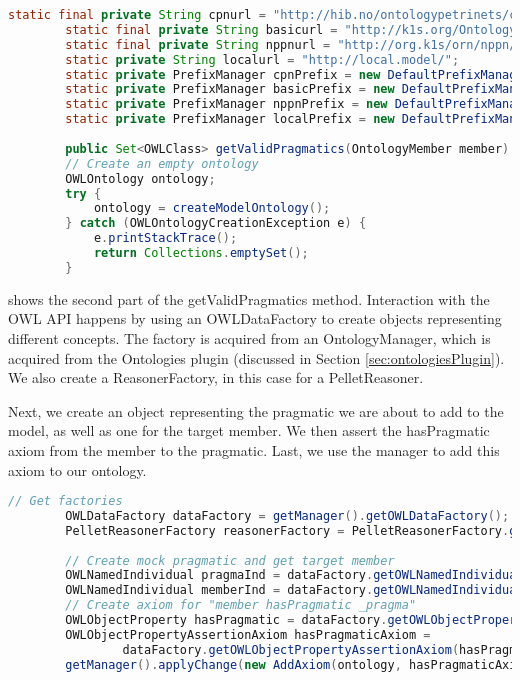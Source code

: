 	\begin{lstlisting}[language=Java,float,label=lst:validPragma1,
	caption=getValidPragmatics Part 1]
		static final private String cpnurl = "http://hib.no/ontologypetrinets/cpn/";
		static final private String basicurl = "http://k1s.org/OntologyRestrictedNets/basic/";
		static final private String nppnurl = "http://org.k1s/orn/nppn/";
		static private String localurl = "http://local.model/";
		static private PrefixManager cpnPrefix = new DefaultPrefixManager(cpnurl);
		static private PrefixManager basicPrefix = new DefaultPrefixManager(basicurl);
		static private PrefixManager nppnPrefix = new DefaultPrefixManager(nppnurl);
		static private PrefixManager localPrefix = new DefaultPrefixManager(localurl);
	
		public Set<OWLClass> getValidPragmatics(OntologyMember member) throws CausesInconcistencyException {
		// Create an empty ontology
		OWLOntology ontology;
		try {
			ontology = createModelOntology();
		} catch (OWLOntologyCreationException e) {
			e.printStackTrace();
			return Collections.emptySet();
		}
	\end{lstlisting}
	
	 shows the second part of the getValidPragmatics method.
	Interaction with the OWL API happens by using an OWLDataFactory to create
	objects representing different concepts. The factory is acquired from an OntologyManager, which is
	acquired from the Ontologies plugin (discussed in Section
	\ref{sec:ontologiesPlugin}). We also create a ReasonerFactory, in this case
	for a PelletReasoner. 
	
	Next, we create an object representing the pragmatic we are about to add to the
	model, as well as one for the target member. We then assert the hasPragmatic
	axiom from the member to the pragmatic. Last, we use the manager to add this
	axiom to our ontology.
	
	\begin{lstlisting}[language=Java,float,label=lst:validPragma2,
	caption=getValidPragmatics Part 2]
		// Get factories
		OWLDataFactory dataFactory = getManager().getOWLDataFactory();
		PelletReasonerFactory reasonerFactory = PelletReasonerFactory.getInstance();
		
		// Create mock pragmatic and get target member
        OWLNamedIndividual pragmaInd = dataFactory.getOWLNamedIndividual(":_pragma",localPrefix);
        OWLNamedIndividual memberInd = dataFactory.getOWLNamedIndividual(":"+member.getId(), localPrefix);
        // Create axiom for "member hasPragmatic _pragma"
		OWLObjectProperty hasPragmatic = dataFactory.getOWLObjectProperty(":hasPragmatic", basicPrefix);
		OWLObjectPropertyAssertionAxiom hasPragmaticAxiom = 
				dataFactory.getOWLObjectPropertyAssertionAxiom(hasPragmatic, memberInd, pragmaInd);
		getManager().applyChange(new AddAxiom(ontology, hasPragmaticAxiom));
	\end{lstlisting}
	
